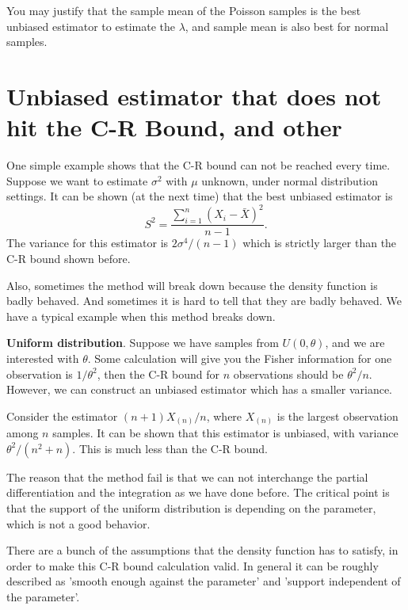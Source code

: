 \documentclass[12pt]{article}
\newcommand{\1}{\mathbbm{1}}
\begin{document}
You may justify that the sample mean of the Poisson samples is the best unbiased estimator to estimate the $\lambda$, and sample mean is also best for normal samples.

\section{Unbiased estimator that does not hit the C-R Bound, and other}

One simple example shows that the C-R bound can not be reached every time. Suppose we want to estimate $\sigma^2$ with $\mu$ unknown, under normal distribution settings. It can be shown (at the next time) that the best unbiased estimator is
$$
S^2 = \frac{\sum_{i=1}^n(X_i -\bar{X})^2 }{n-1}.
$$
The variance for this estimator is $2\sigma^4 / (n-1)$ which is strictly larger than the C-R bound shown before.

Also, sometimes the method will break down because the density function is badly behaved. And sometimes it is hard to tell that they are badly behaved. We have a typical example when this method breaks down.

\textbf{Uniform distribution}. Suppose we have samples from $U(0,\theta)$, and we are interested with $\theta$. Some calculation will give you the Fisher information for one observation is $1/\theta^2$, then the C-R bound for $n$ observations should be $\theta^2/n$. However, we can construct an unbiased estimator which has a smaller variance.

Consider the estimator $(n+1)X_{(n)}/n$, where $X_{(n)}$ is the largest observation among $n$ samples. It can be shown that this estimator is unbiased, with variance $\theta^2/(n^2+n)$. This is much less than the C-R bound. 

The reason that the method fail is that we can not interchange the partial differentiation and the integration as we have done before. The critical point is that the support of the uniform distribution is depending on the parameter, which is not a good behavior. 

There are a bunch of the assumptions that the density function has to satisfy, in order to make this C-R bound calculation valid. In general it can be roughly described as 'smooth enough against the parameter' and 'support independent of the parameter'. 
\end{document}

